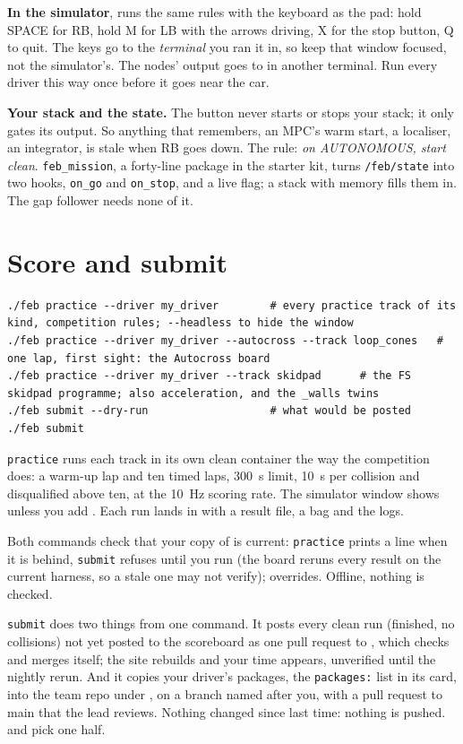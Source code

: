 \documentclass[11pt,a4paper]{article}
\begin{document}
\textbf{In the simulator},  runs the same rules with the
keyboard as the pad: hold SPACE for RB, hold M for LB with the arrows driving, X for the stop
button, Q to quit. The keys go to the \emph{terminal} you ran it in, so keep that window focused,
not the simulator's. The nodes' output goes to  in another terminal. Run every
driver this way once before it goes near the car.

\textbf{Your stack and the state.} The button never starts or stops your stack; it only gates its
output. So anything that remembers, an MPC's warm start, a localiser, an integrator, is stale when
RB goes down. The rule: \emph{on AUTONOMOUS, start clean}. \texttt{feb\_mission}, a forty-line
package in the starter kit, turns \texttt{/feb/state} into two hooks, \texttt{on\_go} and
\texttt{on\_stop}, and a live flag; a stack with memory fills them in. The gap follower needs none
of it.

\section{Score and submit}

\begin{lstlisting}
./feb practice --driver my_driver        # every practice track of its kind, competition rules; --headless to hide the window
./feb practice --driver my_driver --autocross --track loop_cones   # one lap, first sight: the Autocross board
./feb practice --driver my_driver --track skidpad      # the FS skidpad programme; also acceleration, and the _walls twins
./feb submit --dry-run                   # what would be posted
./feb submit
\end{lstlisting}

\texttt{practice} runs each track in its own clean container the way the competition does: a
warm-up lap and ten timed laps, 300~s limit, 10~s per collision and disqualified above ten, at the
10~Hz scoring rate. The simulator window shows unless you add . Each run lands in
 with a result file, a bag and the logs.

Both commands check that your copy of  is current: \texttt{practice} prints a
line when it is behind, \texttt{submit} refuses until you run  (the board reruns
every result on the current harness, so a stale one may not verify); 
overrides. Offline, nothing is checked.

\texttt{submit} does two things from one command. It posts every clean run (finished, no
collisions) not yet posted to the scoreboard as one pull request to , which
checks and merges itself; the site rebuilds and your time appears, unverified until the nightly
rerun. And it copies your driver's packages, the \texttt{packages:} list in its card, into the
team repo  under , on a branch named after you, with a
pull request to main that the lead reviews. Nothing changed since last time: nothing is pushed.
 and  pick one half.
\end{document}
